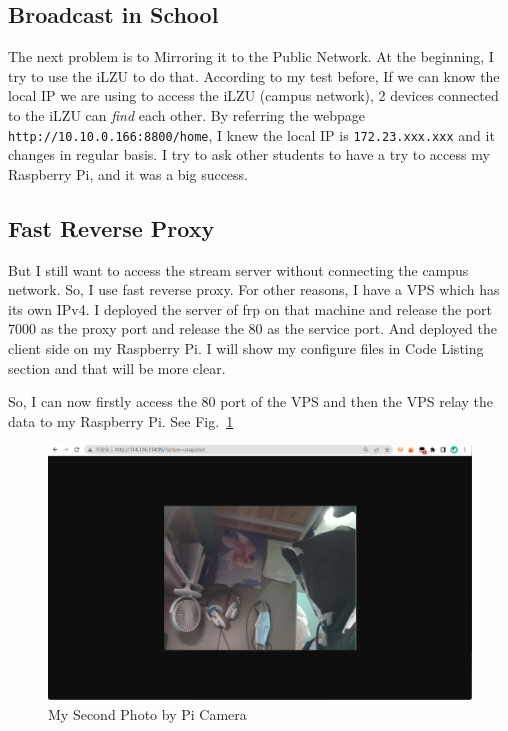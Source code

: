 \documentclass{article}
\begin{document}
\subsection{Broadcast in School}

The next problem is to Mirroring it to the Public Network. At the beginning, I try to use the iLZU to do that. According to my test before, If we can know the local IP we are using to access the iLZU (campus network), 2 devices connected to the iLZU can \emph{find} each other. By referring the webpage \verb|http://10.10.0.166:8800/home|, I knew the local IP is \verb|172.23.xxx.xxx| and it changes in regular basis. I try to ask other students to have a try to access my Raspberry Pi, and it was a big success.

\subsection{Fast Reverse Proxy}

But I still want to access the stream server without connecting the campus network. So, I use fast reverse proxy\cite{gh:frp}. For other reasons, I have a VPS which has its own IPv4. I deployed the server of frp on that machine and release the port 7000 as the proxy port and release the 80 as the service port. And deployed the client side on my Raspberry Pi. I will show my configure files in Code Listing section and that will be more clear.

So, I can now firstly access the 80 port of the VPS and then the VPS relay the data to my Raspberry Pi. See Fig.~\ref{fig:SecondPicOfPicam}

\begin{figure}[!h]
	\centering
	\includegraphics[width=5 in]{../pic/SecondPicOfPicam.png}
	\caption{My Second Photo by Pi Camera}
	\label{fig:SecondPicOfPicam}
\end{figure}
\end{document}
